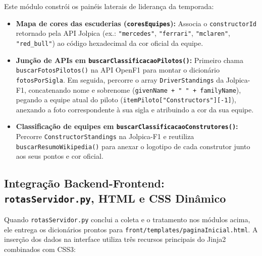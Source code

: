 \documentclass[12pt]{article}
\begin{document}
Este módulo constrói os painéis laterais de liderança da temporada:
\begin{itemize}
    \item \textbf{Mapa de cores das escuderias (\texttt{coresEquipes}):} Associa o \texttt{constructorId} retornado pela API Jolpica (ex.: \texttt{"mercedes"}, \texttt{"ferrari"}, \texttt{"mclaren"}, \texttt{"red\_bull"}) ao código hexadecimal da cor oficial da equipe.
    \item \textbf{Junção de APIs em \texttt{buscarClassificacaoPilotos()}:} Primeiro chama \texttt{buscarFotosPilotos()} na API OpenF1 para montar o dicionário \texttt{fotosPorSigla}. Em seguida, percorre o array \texttt{DriverStandings} da Jolpica-F1, concatenando nome e sobrenome (\texttt{givenName + " " + familyName}), pegando a equipe atual do piloto (\texttt{itemPiloto["Constructors"][-1]}), anexando a foto correspondente à sua sigla e atribuindo a cor da sua equipe.
    \item \textbf{Classificação de equipes em \texttt{buscarClassificacaoConstrutores()}:} Percorre \texttt{ConstructorStandings} na Jolpica-F1 e reutiliza \texttt{buscarResumoWikipedia()} para anexar o logotipo de cada construtor junto aos seus pontos e cor oficial.
\end{itemize}

\subsection{Integração Backend-Frontend: \texttt{rotasServidor.py}, HTML e CSS Dinâmico}

Quando \texttt{rotasServidor.py} conclui a coleta e o tratamento nos módulos acima, ele entrega os dicionários prontos para \texttt{front/templates/paginaInicial.html}. A inserção dos dados na interface utiliza três recursos principais do Jinja2 combinados com CSS3:
\end{document}
